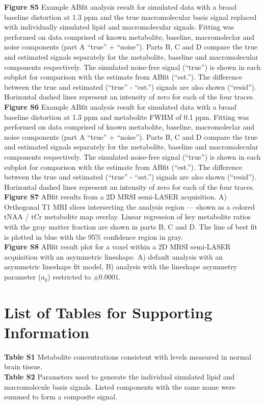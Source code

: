 \documentclass[num-refs]{wiley-article}
\begin{document}
\textbf{Figure S5} Example ABfit analysis result for simulated data with a broad baseline distortion at 1.3 ppm and the true macromolecular basis signal replaced with individually simulated lipid and macromolecular signals. Fitting was performed on data comprised of known metabolite, baseline, macromoleclar and noise components (part A ``true'' + ``noise''). Parts B, C and D compare the true and estimated signals separately for the metabolite, baseline and macromolecular components respectively. The simulated noise-free signal (``true'') is shown in each subplot for comparison with the estimate from ABfit (``est.''). The difference between the true and estimated (``true'' - ``est.'') signals are also shown (``resid''). Horizontal dashed lines represent an intensity of zero for each of the four traces.\\
\textbf{Figure S6} Example ABfit analysis result for simulated data with a broad baseline distortion at 1.3 ppm and metabolite FWHM of 0.1 ppm. Fitting was performed on data comprised of known metabolite, baseline, macromoleclar and noise components (part A ``true'' + ``noise''). Parts B, C and D compare the true and estimated signals separately for the metabolite, baseline and macromolecular components respectively. The simulated noise-free signal (``true'') is shown in each subplot for comparison with the estimate from ABfit (``est.''). The difference between the true and estimated (``true'' - ``est.'') signals are also shown (``resid''). Horizontal dashed lines represent an intensity of zero for each of the four traces.\\
\textbf{Figure S7} ABfit results from a 2D MRSI semi-LASER acquisition. A) Orthogonal T1 MRI slices intersecting the analysis region --- shown as a colored tNAA / tCr metabolite map overlay. Linear regression of key metabolite ratios with the gray matter fraction are shown in parts B, C and D. The line of best fit is plotted in blue with the 95\% confidence region in gray.\\
\textbf{Figure S8} ABfit result plot for a voxel within a 2D MRSI semi-LASER acquisition with an asymmetric lineshape. A) default analysis with an asymmetric lineshape fit model, B) analysis with the lineshape asymmetry parameter ($a_{g}$) restricted to $\pm 0.0001$.\\

\section*{List of Tables for Supporting Information}
\textbf{Table S1} Metabolite concentrations consistent with levels measured in normal brain tissue. \\
\textbf{Table S2} Parameters used to generate the individual simulated lipid and macromolecule basis signals. Listed components with the same name were summed to form a composite signal. \\
\end{document}
